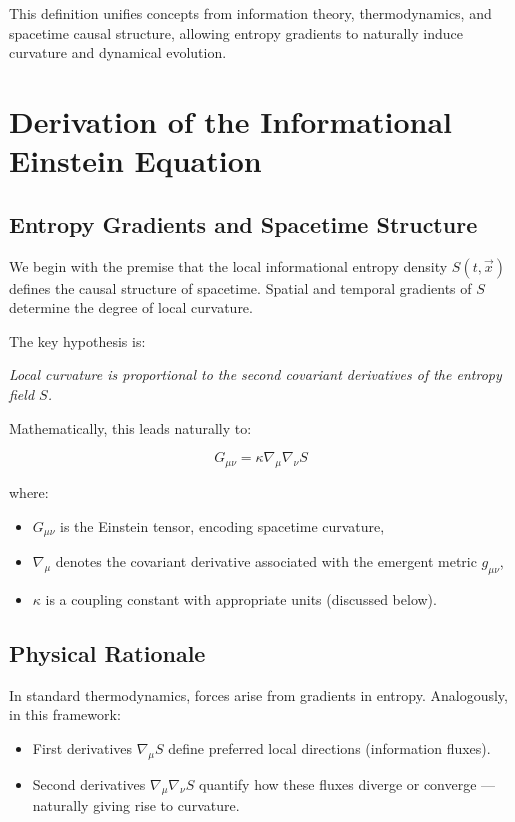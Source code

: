 \documentclass{article}
\begin{document}
This definition unifies concepts from information theory, thermodynamics, and spacetime causal structure, allowing entropy gradients to naturally induce curvature and dynamical evolution.

\section{Derivation of the Informational Einstein Equation}

\subsection{Entropy Gradients and Spacetime Structure}

We begin with the premise that the local informational entropy density $S(t, \vec{x})$ defines the causal structure of spacetime.
Spatial and temporal gradients of $S$ determine the degree of local curvature.

The key hypothesis is:

\textit{Local curvature is proportional to the second covariant derivatives of the entropy field $S$.}

Mathematically, this leads naturally to:

\begin{equation}
G_{\mu\nu} = \kappa \nabla_\mu \nabla_\nu S
\label{eq:InformationalEinstein}
\end{equation}

where:
\begin{itemize}
    \item $G_{\mu\nu}$ is the Einstein tensor, encoding spacetime curvature,
    \item $\nabla_\mu$ denotes the covariant derivative associated with the emergent metric $g_{\mu\nu}$,
    \item $\kappa$ is a coupling constant with appropriate units (discussed below).
\end{itemize}

\subsection{Physical Rationale}

In standard thermodynamics, forces arise from gradients in entropy.
Analogously, in this framework:

\begin{itemize}
\item First derivatives $\nabla_\mu S$ define preferred local directions (information fluxes).
\item Second derivatives $\nabla_\mu \nabla_\nu S$ quantify how these fluxes diverge or converge — naturally giving rise to curvature.
\end{itemize}
\end{document}
